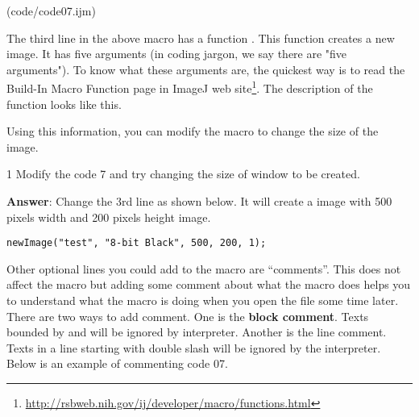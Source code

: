 (code/code07.ijm)

The third line in the above macro has a function . This
function creates a new image. It has five arguments (in coding jargon, we say
there are "five arguments"). To know what these arguments are, 
the quickest way is to read the Build-In Macro Function page in ImageJ web site\footnote{\url{http://rsbweb.nih.gov/ij/developer/macro/functions.html}}.  
The description of the function  looks like this.

\begin{indentCom}

\end{indentCom}
Using this information, you can modify the macro to change the size of the image.

\begin{indentexercise}
{1}
Modify the code 7 and try changing the size of window to be created.

\item \textbf{Answer}: Change the 3rd line as shown below. It will create a image with 500 pixels width and 200 pixels height image.  
	\begin{lstlisting}[numbers=none]
		newImage("test", "8-bit Black", 500, 200, 1);
	\end{lstlisting}
\end{indentexercise}

Other optional lines you could add to the macro are ``comments''. This does not affect the macro but adding some comment about what the macro does helps you to understand what the macro is doing when you open the file some time later. There are two ways to add comment. One is the \textbf{block comment}. Texts bounded by \ilcom{ /*} and \ilcom{*/} will be ignored by interpreter. Another is the line comment. Texts in a line starting with double slash \ilcom{//} will be ignored by the interpreter. Below is an example of commenting code 07.